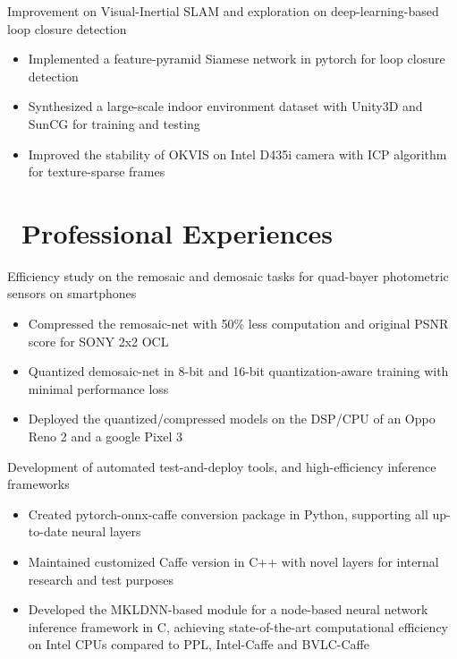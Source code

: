 \documentclass{resume}
\begin{document}
Improvement on Visual-Inertial SLAM and exploration on deep-learning-based loop closure detection
\begin{itemize}
  \item Implemented a feature-pyramid Siamese network in pytorch for loop closure detection 
  \item Synthesized a large-scale indoor environment dataset with Unity3D and SunCG for training and testing
  \item Improved the stability of OKVIS on Intel D435i camera with ICP algorithm for texture-sparse frames
\end{itemize}

\section{\faSuitcase\ Professional Experiences}

Efficiency study on the remosaic and demosaic tasks for quad-bayer photometric sensors on smartphones
\begin{itemize}
  \item Compressed the remosaic-net with 50\% less computation and original PSNR score for SONY 2x2 OCL
  \item Quantized demosaic-net in 8-bit and 16-bit quantization-aware training with minimal performance loss
  \item Deployed the quantized/compressed models on the DSP/CPU of an Oppo Reno 2 and a google Pixel 3 
\end{itemize}

Development of automated test-and-deploy tools, and high-efficiency inference frameworks
\begin{itemize}
  \item Created pytorch-onnx-caffe conversion package in Python, supporting all up-to-date neural layers
  \item Maintained customized Caffe version in C++ with novel layers for internal research and test purposes
  \item Developed the MKLDNN-based module for a node-based neural network inference framework in C, achieving state-of-the-art computational
efficiency on Intel CPUs compared to PPL, Intel-Caffe and BVLC-Caffe
\end{itemize}
\end{document}
